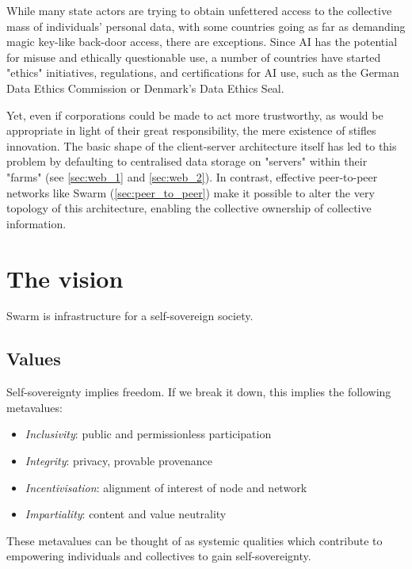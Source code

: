 While many state actors are trying to obtain unfettered access to the collective mass of individuals' personal data, with some countries going as far as demanding magic key-like back-door access, there are exceptions. Since AI has the potential for misuse and ethically questionable use, a number of countries have started "ethics" initiatives, regulations, and certifications for AI use, such as the German Data Ethics Commission or Denmark's Data Ethics Seal. 

Yet, even if corporations could be made to act more trustworthy, as would be appropriate in light of their great responsibility, the mere existence of  stifles innovation. The basic shape of the client-server architecture itself has led to this problem by defaulting to centralised data storage on "servers" within their "farms" (see \ref{sec:web_1} and \ref{sec:web_2}). In contrast, effective peer-to-peer networks like Swarm (\ref{sec:peer_to_peer}) make it possible to alter the very topology of this architecture, enabling the collective ownership of collective information. 


\section{The vision  \statusorange}\label{sec:vision}

\begin{displayquote}
Swarm is infrastructure for a self-sovereign society. 
\end{displayquote}


\subsection{Values \statusorange}\label{sec:values}

Self-sovereignty implies freedom. If we break it down, this implies the following metavalues: 

\begin{itemize}[noitemsep]
\item \emph{Inclusivity}\/: public and permissionless participation
\item \emph{Integrity}\/: privacy, provable provenance 
\item \emph{Incentivisation}\/: alignment of interest of node and network
\item \emph{Impartiality}\/: content and value neutrality  
\end{itemize}

These metavalues can be thought of as systemic qualities which contribute to empowering individuals and collectives to gain self-sovereignty.

